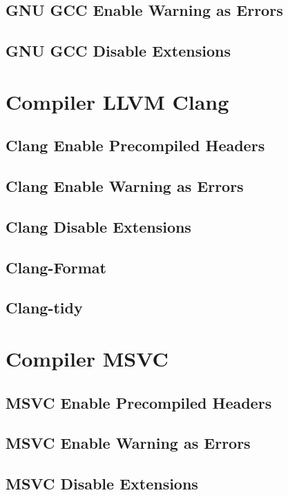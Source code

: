 \subsection{GNU GCC Enable Warning as Errors}
\subsection{GNU GCC Disable Extensions}


\section{Compiler LLVM Clang}

\subsection{Clang Enable Precompiled Headers}
\subsection{Clang Enable Warning as Errors}
\subsection{Clang Disable Extensions}

\subsection{Clang-Format}

\subsection{Clang-tidy}


\section{Compiler MSVC}

\subsection{MSVC Enable Precompiled Headers}
\subsection{MSVC Enable Warning as Errors}
\subsection{MSVC Disable Extensions}

